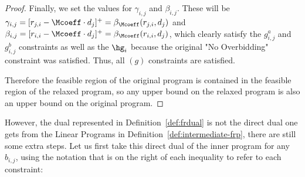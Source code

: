\begin{proof}
Finally, we set the values for $\gamma_{i,j}$ and $\beta_{i,j}$. These will be $\gamma_{i,j} = [r_{j,i}-\Mcoeff \cdot d_j]^+  =\beta_{\Mcoeff}(r_{j,i},d_j)$ and $\beta_{i,j} = [r_{i,i}-\Mcoeff\cdot d_j]^+=\beta_{\Mcoeff}(r_{i,i},d_j)$, which clearly satisfy the $g^a_{i,j}$ and $g^b_{i,j}$ constraints as well as the $\hg_i$ because the original "No Overbidding" constraint was satisfied. Thus, all $(g)$ constraints are satisfied.

Therefore the feasible region of the original program is contained in the feasible region of the relaxed program, so any upper bound on the relaxed program is also an upper bound on the original program.
\end{proof}

However, the dual represented in Definition~\ref{def:frdual} is not the direct dual one gets from the Linear Programs in Definition~\ref{def:intermediate-frp}, there are still some extra steps. Let us first take this direct dual of the inner program for any $b_{i,j}$, using the notation that is on the right of each inequality to refer to each constraint:
